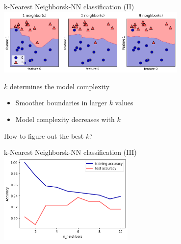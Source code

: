 \documentclass[10pt,compress]{beamer} %
\begin{document}
\begin{frame}{k-Nearest Neighbors}{k-NN classification (II)}
    \centering 
	\includegraphics[width=0.7\textwidth]{figs/knnboundary.png}

    \flushleft

    $k$ determines the model complexity
    \begin{itemize}
        \item Smoother boundaries in larger $k$ values
        \item Model complexity decreases with $k$
    \end{itemize}
    How to figure out the best $k$?
\end{frame}

\begin{frame}{k-Nearest Neighbors}{k-NN classification (III)}
    \centering 
	\includegraphics[width=0.5\textwidth]{figs/k-complexity.png}
\end{frame}
\end{document}
